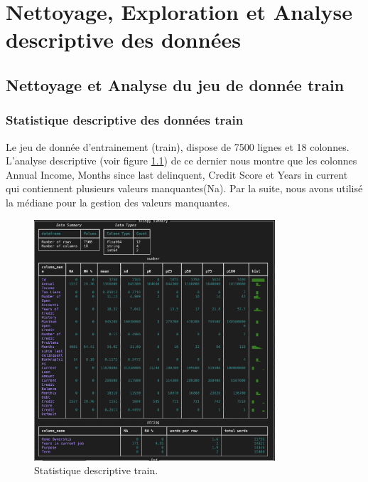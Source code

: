 
\chapter{Nettoyage, Exploration et Analyse descriptive des données}
\minitoc
\newpage
\section{Nettoyage et Analyse du jeu de donnée train}


\subsection{Statistique descriptive des données train }
Le jeu de donnée d'entrainement (train), dispose de 7500 lignes et 18 colonnes. L'analyse descriptive (voir figure \ref{fig:stat_descriptive}) de ce dernier nous montre que les colonnes Annual Income, Months since last delinquent, Credit Score et Years in current qui contiennent plusieurs valeurs manquantes(Na). Par la suite, nous avons utilisé la médiane pour la gestion des valeurs manquantes. 

\begin{figure}[H]
\centering
\includegraphics[width=0.8\textwidth]{figures/fig1.png}
\caption{Statistique descriptive train.}
\label{fig:stat_descriptive}
\end{figure}


